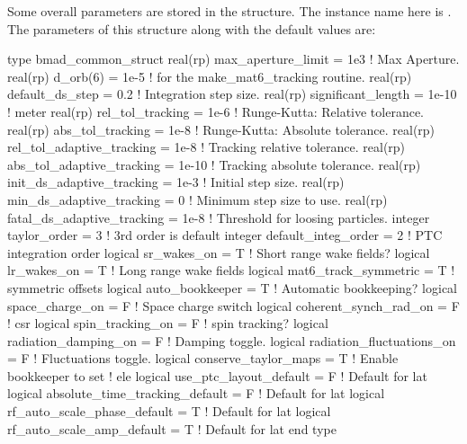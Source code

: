 Some overall parameters are stored in the 
structure. The instance name here is . The parameters of
this structure along with the default values are:
\begin{example}
  type bmad_common_struct
    real(rp) max_aperture_limit = 1e3          ! Max Aperture.
    real(rp) d_orb(6)           = 1e-5         ! for the make_mat6_tracking routine.
    real(rp) default_ds_step    = 0.2          ! Integration step size.  
    real(rp) significant_length = 1e-10        ! meter 
    real(rp) rel_tol_tracking = 1e-6           ! Runge-Kutta: Relative tolerance.
    real(rp) abs_tol_tracking = 1e-8           ! Runge-Kutta: Absolute tolerance.
    real(rp) rel_tol_adaptive_tracking = 1e-8  ! Tracking relative tolerance.
    real(rp) abs_tol_adaptive_tracking = 1e-10 ! Tracking absolute tolerance.
    real(rp) init_ds_adaptive_tracking = 1e-3  ! Initial step size.
    real(rp) min_ds_adaptive_tracking = 0      ! Minimum step size to use.
    real(rp) fatal_ds_adaptive_tracking = 1e-8 ! Threshold for loosing particles.
    integer taylor_order = 3                   ! 3rd order is default
    integer default_integ_order = 2            ! PTC integration order
    logical sr_wakes_on = T                    ! Short range wake fields?
    logical lr_wakes_on = T                    ! Long range wake fields
    logical mat6_track_symmetric = T           ! symmetric offsets
    logical auto_bookkeeper = T                ! Automatic bookkeeping?
    logical space_charge_on = F                ! Space charge switch
    logical coherent_synch_rad_on = F          ! csr 
    logical spin_tracking_on = F               ! spin tracking?
    logical radiation_damping_on = F           ! Damping toggle.
    logical radiation_fluctuations_on = F      ! Fluctuations toggle.
    logical conserve_taylor_maps = T           ! Enable bookkeeper to set
                                               ! ele%
    logical use_ptc_layout_default = F         ! Default for lat%
    logical absolute_time_tracking_default = F ! Default for lat%
    logical rf_auto_scale_phase_default = T    ! Default for lat%
    logical rf_auto_scale_amp_default = T      ! Default for lat%
  end type
\end{example}

